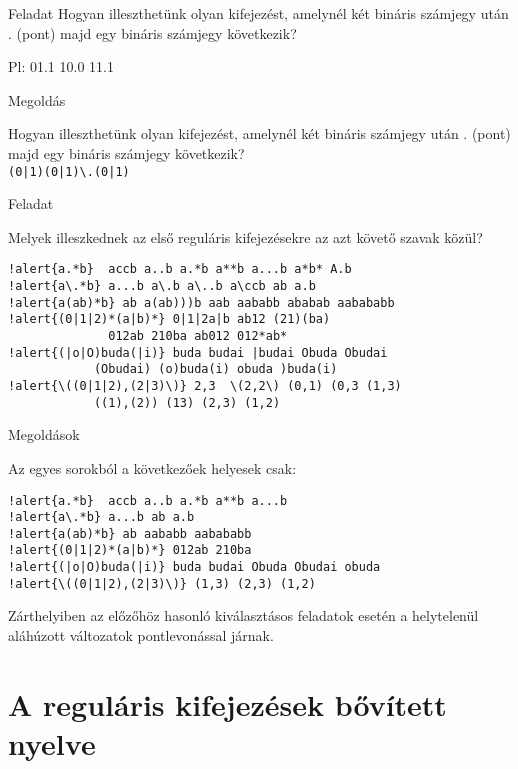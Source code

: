 \documentclass[
    ignorenonframetext
    ]{beamer}
\begin{document}
\begin{frame}[fragile]
    {Feladat}
    Hogyan illeszthetünk olyan kifejezést, amelynél két bináris számjegy
    után . (pont) majd egy bináris számjegy következik?

    Pl: 01.1  10.0 11.1

    \megoldasjon
\end{frame}

\begin{frame}[fragile]
    {Megoldás}

    Hogyan illeszthetünk olyan kifejezést, amelynél két bináris számjegy
    után . (pont) majd egy bináris számjegy következik?\\
    \verb!(0|1)(0|1)\.(0|1)!
\end{frame}

\begin{frame}
    [fragile]{Feladat}

    Melyek illeszkednek az első reguláris kifejezésekre az azt követő
    szavak közül?

\begin{Verbatim}[commandchars=!\{\}]
!alert{a.*b}  accb a..b a.*b a**b a...b a*b* A.b
!alert{a\.*b} a...b a\.b a\..b a\ccb ab a.b
!alert{a(ab)*b} ab a(ab)))b aab aababb ababab aabababb
!alert{(0|1|2)*(a|b)*} 0|1|2a|b ab12 (21)(ba)
              012ab 210ba ab012 012*ab*
!alert{(|o|O)buda(|i)} buda budai |budai Obuda Obudai
            (Obudai) (o)buda(i) obuda )buda(i)
!alert{\((0|1|2),(2|3)\)} 2,3  \(2,2\) (0,1) (0,3 (1,3)
            ((1),(2)) (13) (2,3) (1,2)
\end{Verbatim}
\end{frame}

\begin{frame}[fragile]
    {Megoldások}

    Az egyes sorokból a következőek helyesek csak:

\begin{Verbatim}[commandchars=!\{\}]
!alert{a.*b}  accb a..b a.*b a**b a...b
!alert{a\.*b} a...b ab a.b
!alert{a(ab)*b} ab aababb aabababb
!alert{(0|1|2)*(a|b)*} 012ab 210ba
!alert{(|o|O)buda(|i)} buda budai Obuda Obudai obuda
!alert{\((0|1|2),(2|3)\)} (1,3) (2,3) (1,2)
\end{Verbatim}

    Zárthelyiben az előzőhöz hasonló kiválasztásos feladatok esetén a
    helytelenül aláhúzott változatok pontlevonással járnak.
\end{frame}

\section{A reguláris kifejezések bővített nyelve}
\end{document}
